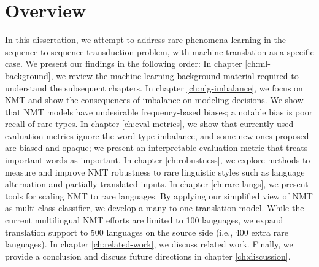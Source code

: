 \section*{Overview}
In this dissertation, we attempt to address rare phenomena learning in the sequence-to-sequence transduction problem, with machine translation as a specific case. We present our findings in the following order:
In chapter \ref{ch:ml-background}, we review the machine learning background material required to understand the subsequent chapters. 
In chapter \ref{ch:nlg-imbalance}, we focus on NMT and show the consequences of imbalance on modeling decisions. We show that NMT models have undesirable frequency-based biases; a notable bias is poor recall of rare types. 
In chapter \ref{ch:eval-metrics}, we show that currently used evaluation metrics ignore the word type imbalance, and some new ones proposed are biased and opaque; we present an interpretable evaluation metric that treats important words as important.
In chapter \ref{ch:robustness}, we explore methods to measure and improve NMT robustness to rare linguistic styles such as language alternation and partially translated inputs.
In chapter \ref{ch:rare-langs}, we present tools for scaling NMT to rare languages. 
By applying our simplified view of NMT as multi-class classifier, we develop a many-to-one translation model.
While the current multilingual NMT efforts are limited to 100 languages, we expand translation support to 500 languages on the source side (i.e., 400 extra rare languages). 
In chapter \ref{ch:related-work}, we discuss related work. 
Finally, we provide a conclusion and discuss future directions in chapter \ref{ch:discussion}. 

